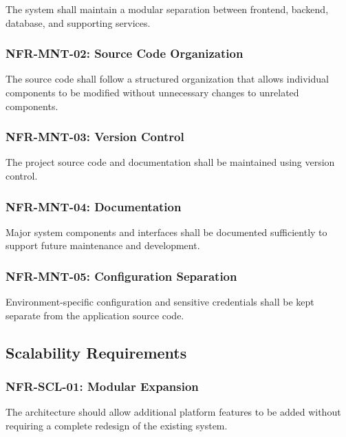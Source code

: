 The system shall maintain a modular separation between frontend,
backend, database, and supporting services.

\subsubsection{NFR-MNT-02: Source Code Organization}

The source code shall follow a structured organization that allows
individual components to be modified without unnecessary changes to
unrelated components.

\subsubsection{NFR-MNT-03: Version Control}

The project source code and documentation shall be maintained using
version control.

\subsubsection{NFR-MNT-04: Documentation}

Major system components and interfaces shall be documented sufficiently
to support future maintenance and development.

\subsubsection{NFR-MNT-05: Configuration Separation}

Environment-specific configuration and sensitive credentials shall be
kept separate from the application source code.



\subsection{Scalability Requirements}

\subsubsection{NFR-SCL-01: Modular Expansion}

The architecture should allow additional platform features to be added
without requiring a complete redesign of the existing system.

